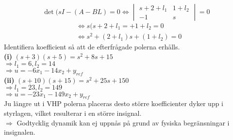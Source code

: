 \documentclass[12pt]{article}
\begin{document}
\[\det{(sI - (A-BL)} = 0 \Leftrightarrow \begin{vmatrix}
s + 2 + l_1 & 1 + l_2 \\
-1 & s
\end{vmatrix} = 0 \]
\begin{align*}
&\Leftrightarrow s(s+2+l_1= + 1 + l_2 = 0 \\
&\Leftrightarrow s^2 + (2 + l_1)s + (1 + l_2) = 0
\end{align*}
Identifiera koefficient så att de efterfrågade polerna erhålls. \\

\textbf{(i)} $(s+3)(s+5) = s^2 + 8s + 15$ \\
$\Rightarrow l_1 = 6, l_2 = 14$ \\
$\Rightarrow u = -6x_1 - 14x_2 + y_{ref}$ \\

\textbf{(ii)} $(s+10)(s+15) = s^2 + 25s + 150$ \\
$\Rightarrow l_1 = 23, l_2 = 149$ \\
$\Rightarrow u = -23x_1 - 149x_2 + y_{ref}$ \\

Ju längre ut i VHP polerna placeras desto  större koefficienter dyker upp i styrlagen, vilket resulterar i en större insignal. \\
$\Rightarrow$ Godtycklig dynamik kan ej uppnås på grund av fysiska begränsningar i insignalen. 
\end{document}
